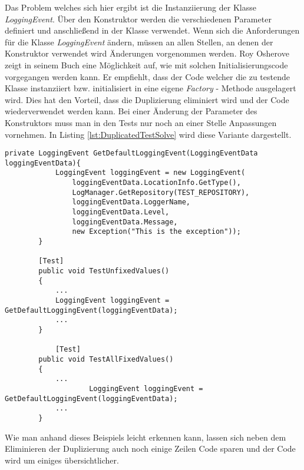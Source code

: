 \SuperPar Das Problem welches sich hier ergibt ist die Instanziierung der Klasse \textit{LoggingEvent}. Über den Konstruktor werden die verschiedenen Parameter definiert und anschließend in der Klasse verwendet. Wenn sich die Anforderungen für die Klasse \textit{LoggingEvent} ändern,  müssen an allen Stellen, an denen der Konstruktor verwendet wird Änderungen vorgenommen werden. Roy Osherove zeigt in seinem Buch \cite{Osherove2013} eine Möglichkeit auf, wie mit solchen Initialisierungscode vorgegangen werden kann. Er empfiehlt, dass der Code welcher die zu testende Klasse instanziiert bzw. initialisiert in eine eigene \textit{Factory} - Methode ausgelagert wird. Dies hat den Vorteil, dass die Duplizierung eliminiert wird und der Code wiederverwendet werden kann. Bei einer Änderung der Parameter des Konstruktors muss man in den Tests nur noch an einer Stelle Anpassungen vornehmen. In Listing \ref{lst:DuplicatedTestSolve} wird diese Variante dargestellt.


\begin{lstlisting}[language={[Sharp]C}, caption=Eliminerung der Duplizierung durch Factorymethode, label=lst:DuplicatedTestSolve]
		private LoggingEvent GetDefaultLoggingEvent(LoggingEventData loggingEventData){
			LoggingEvent loggingEvent = new LoggingEvent(
				loggingEventData.LocationInfo.GetType(),
				LogManager.GetRepository(TEST_REPOSITORY),
				loggingEventData.LoggerName,
				loggingEventData.Level,
				loggingEventData.Message,
				new Exception("This is the exception"));
		}

		[Test]
		public void TestUnfixedValues()
		{
			...
			LoggingEvent loggingEvent = GetDefaultLoggingEvent(loggingEventData);
			...
		}
		
			[Test]
		public void TestAllFixedValues()
		{
			...
					LoggingEvent loggingEvent = GetDefaultLoggingEvent(loggingEventData);
			...
		}
\end{lstlisting}

\SuperPar Wie man anhand dieses Beispiels leicht erkennen kann, lassen sich neben dem Eliminieren der Duplizierung auch noch einige Zeilen Code sparen und der Code wird um einiges übersichtlicher.
